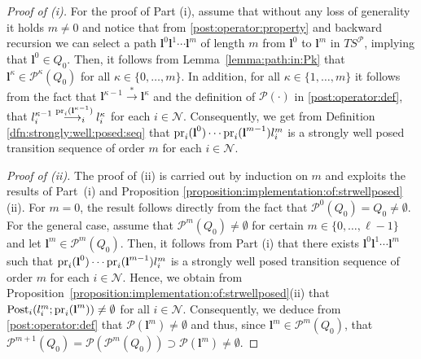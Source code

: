 \documentclass[reqno]{amsart}
\theoremstyle{plain}
\theoremstyle{definition}
\numberwithin{equation}{section}
\begin{document}
\begin{proof}[Proof of (i)]
For the proof of Part (i), assume that without any loss of generality it holds $m\ne 0$ and notice that from \eqref{post:operator:property} and backward recursion we can select a path  ${\textbf{{l}}}^0 {\textbf{{l}}}^1\cdots{\textbf{{l}}}^{m}$  of length $m$ from ${\textbf{{l}}}^0$ to ${\textbf{{l}}}^m$ in $TS^{\ensuremath{\mathcal{P}}}$, implying that ${\textbf{{l}}}^0\in Q_0$. Then, it follows from Lemma~\ref{lemma:path:in:Pk} that ${\textbf{{l}}}^{\kappa}\in{\ensuremath{\mathcal{P}}}^{\kappa}(Q_0)$ for all $\kappa\in\{0,\ldots,m\}$. In addition, for all $\kappa\in\{1,\ldots,m\}$ it follows from the fact that ${\textbf{{l}}}^{\kappa-1}\overset{*}{\longrightarrow}{\textbf{{l}}}^{\kappa}$ and the definition of ${\ensuremath{\mathcal{P}}}(\cdot)$ in \eqref{post:operator:def}, that $l_i^{\kappa-1}\overset{{\rm pr}_i({\textbf{{l}}}^{\kappa-1})}{\longrightarrow_i}l_i^{\kappa}$ for each $i\in{\ensuremath{\mathcal{N}}}$. Consequently, we get from Definition \ref{dfn:strongly:well:posed:seq} that ${\rm pr}_i({\textbf{{l}}}^0)\cdots{\rm pr}_i({\textbf{{l}}}^{m-1})l^m_i$ is a strongly well posed transition sequence of order $m$ for each $i\in{\ensuremath{\mathcal{N}}}$.  

\noindent \textit{Proof of (ii).} The proof of (ii) is carried out by induction on $m$ and exploits the results of Part~(i) and Proposition  \ref{proposition:implementation:of:strwellposed}(ii).
For $m=0$, the result follows directly from the fact that ${\ensuremath{\mathcal{P}}}^0(Q_0)=Q_0\ne\emptyset$. 
For the general case, assume that ${\ensuremath{\mathcal{P}}}^m(Q_0)\ne\emptyset$ for certain $m\in\{0,\ldots,\ell-1\}$ and let ${\textbf{{l}}}^m\in {\ensuremath{\mathcal{P}}}^m(Q_0)$. Then, it follows from Part (i) that there exists ${\textbf{{l}}}^0{\textbf{{l}}}^1\cdots{\textbf{{l}}}^m$ such that ${\rm pr}_i({\textbf{{l}}}^0)\cdots{\rm pr}_i({\textbf{{l}}}^{m-1})l^m_i$ is a strongly well posed transition sequence of order $m$ for each $i\in{\ensuremath{\mathcal{N}}}$. Hence, we obtain from Proposition~\ref{proposition:implementation:of:strwellposed}(ii) that ${\rm Post}_i(l_i^m;{\rm pr}_i({\textbf{{l}}}^m))\ne\emptyset$ for all $i\in{\ensuremath{\mathcal{N}}}$. Consequently, we deduce from \eqref{post:operator:def} that ${\ensuremath{\mathcal{P}}}({\textbf{{l}}}^m)\ne\emptyset$ and thus, since ${\textbf{{l}}}^m\in {\ensuremath{\mathcal{P}}}^m(Q_0)$, that ${\ensuremath{\mathcal{P}}}^{m+1}(Q_0)={\ensuremath{\mathcal{P}}}({\ensuremath{\mathcal{P}}}^m(Q_0))\supset {\ensuremath{\mathcal{P}}}({\textbf{{l}}}^m)\ne\emptyset$.    
\end{proof}
\end{document}
